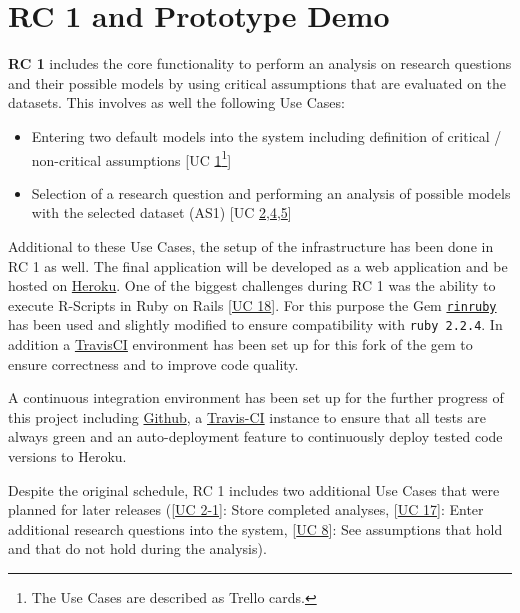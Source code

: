 \documentclass[11pt,twocolumn]{article}
\begin{document}
\section{ RC 1 and Prototype Demo}
\textbf{RC 1} includes the core functionality to perform an analysis on research questions and their possible models by using critical assumptions that are evaluated on the datasets. This involves as well the following Use Cases: 
\begin{itemize}
	\item Entering two default models into the system including definition of critical / non-critical assumptions [UC \href{https://trello.com/c/KEOokZp9}{1}\footnote{The Use Cases are described as Trello cards. }]
\item  Selection of a research question and performing an analysis of possible models with the selected dataset (AS1) [UC \href{https://trello.com/c/ebVrFdA5}{2},\href{https://trello.com/c/7NINsfz8}{4},\href{https://trello.com/c/22JGne3r}{5}]
\end{itemize}

Additional to these Use Cases, the setup of the infrastructure has been done in RC 1 as well. The final application will be developed as a web application and be hosted on \href{http://heroku.com}{Heroku}. 
One of the biggest challenges during RC 1 was the ability to execute R-Scripts in Ruby on Rails [\href{https://trello.com/c/dpLHOxbB}{UC 18}]. For this purpose the Gem \href{https://github.com/sebastianzillessen/rinruby}{\texttt{rinruby}} has been used and slightly modified to ensure compatibility with \texttt{ruby 2.2.4}. In addition a \href{https://travis-ci.org/sebastianzillessen/rinruby}{TravisCI} environment has been set up for this fork of the gem to ensure correctness and to improve code quality. 

A continuous integration environment has been set up for the further progress of this project including \href{https://github.com/}{Github}, a \href{https://travis-ci.com}{Travis-CI} instance to ensure that all tests are always green and an auto-deployment feature to continuously deploy tested code versions to Heroku. 

Despite the original schedule, RC 1 includes two additional Use Cases that were planned for later releases ([\href{https://trello.com/c/ORRBjISQ}{UC 2-1}]: Store completed analyses, [\href{https://trello.com/c/Hv2xe2UW}{UC 17}]: Enter additional research questions into the system, [\href{https://trello.com/c/be2088JH}{UC 8}]: See assumptions that hold and that do not hold during the analysis). 
\end{document}
